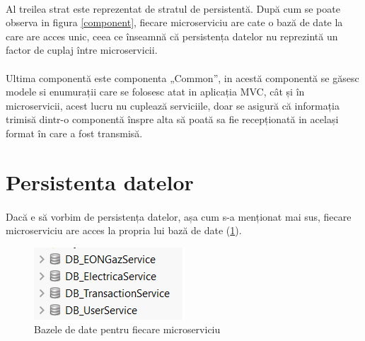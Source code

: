 \documentclass[12pt]{report}
\begin{document}
  	\paragraph{}Al treilea strat este reprezentat de stratul de persistentă. După cum se poate observa in figura \ref{component}, fiecare microserviciu are cate o bază de date la care are acces unic, ceea ce înseamnă că persistența datelor nu reprezintă un factor de cuplaj între microservicii. 
  	\paragraph{}Ultima componentă este componenta „Common”, in acestă componentă se găsesc modele si enumurații care se folosesc atat in aplicația MVC, cât și în microservicii, acest lucru nu cuplează serviciile, doar se asigură că informația trimisă dintr-o componentă înspre alta să poată sa fie recepționată in același format în care a fost transmisă.
	\section{Persistenta datelor}
	\paragraph{}Dacă e să vorbim de persistența datelor, așa cum s-a menționat mai sus, fiecare microserviciu are acces la propria lui bază de date (\ref{db}).
	\begin{figure}[h]
  	\centering
  	\includegraphics[scale=1]{db}
	\caption{Bazele de date pentru fiecare microserviciu}  
	\label{db}
  	\end{figure}
\end{document}
